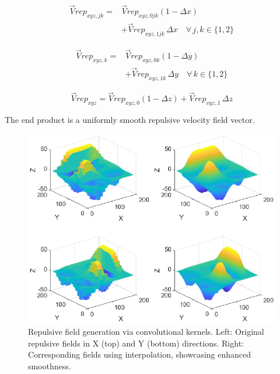 \documentclass[letterpaper, 10 pt, conference]{ieeeconf}  %
\begin{document}
\begin{equation}
\begin{aligned}
	\vec{V}rep_{xyz,jk} = &\vec{V}rep_{xyz,0jk}(1 - \Delta x) \\
	&+ \vec{V}rep_{xyz,1jk} \, \Delta x \quad \forall \, j, k \in \{1, 2\}
\end{aligned}
\end{equation}


\begin{equation}
	\begin{aligned}
		\vec{V}rep_{xyz,k} = &\vec{V}rep_{xyz,0k}(1 - \Delta y) \\
		&+ \vec{V}rep_{xyz,1k} \, \Delta y \quad \forall \, k \in \{1, 2\}
	\end{aligned}
\end{equation}


\begin{equation}
	\label{eq: interp z}
	\vec{V}rep_{xyz} = \vec{V}rep_{xyz,0}(1 - \Delta z) + \vec{V}rep_{xyz,1} \, \Delta z 
\end{equation}

The end product is a uniformly smooth repulsive velocity field vector. 


\begin{figure}
	\centering
	\includegraphics[width=1\linewidth]{non_and_interp_4_plots.eps} 
	\caption{Repulsive field generation via convolutional kernels. Left: Original repulsive fields in X (top) and Y (bottom) directions. Right: Corresponding fields using interpolation, showcasing enhanced smoothness.}
	\label{fig:interp-experiment}
\end{figure}
\end{document}
